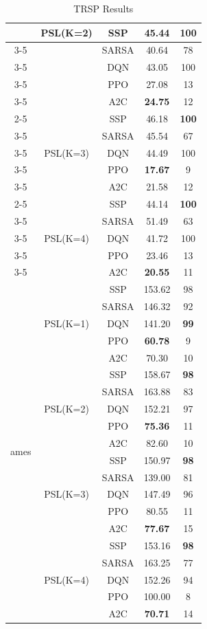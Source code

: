 \begin{table}[]
\begin{tabular}{|c|c|c|c|c|}
 & \multirow{5}{*}{PSL(K=2)} & SSP & 45.44 & \textbf{100} \\ \cline{3-5}
 &  & SARSA & 40.64 & 78 \\ \cline{3-5}
 &  & DQN & 43.05 & 100 \\ \cline{3-5}
 &  & PPO & 27.08 & 13 \\ \cline{3-5}
 &  & A2C & \textbf{24.75} & 12 \\ \cline{2-5}
 & \multirow{5}{*}{PSL(K=3)} & SSP & 46.18 & \textbf{100} \\ \cline{3-5}
 &  & SARSA & 45.54 & 67 \\ \cline{3-5}
 &  & DQN & 44.49 & 100 \\ \cline{3-5}
 &  & PPO & \textbf{17.67} & 9 \\ \cline{3-5}
 &  & A2C & 21.58 & 12 \\ \cline{2-5}
 & \multirow{5}{*}{PSL(K=4)} & SSP & 44.14 & \textbf{100} \\ \cline{3-5}
 &  & SARSA & 51.49 & 63 \\ \cline{3-5}
 &  & DQN & 41.72 & 100 \\ \cline{3-5}
 &  & PPO & 23.46 & 13 \\ \cline{3-5}
 &  & A2C & \textbf{20.55} & 11 \\ \hline
\multirow{20}{*}{ames} & \multirow{5}{*}{PSL(K=1)} & SSP & 153.62 & 98 \\ \cline{3-5}
 &  & SARSA & 146.32 & 92 \\ \cline{3-5}
 &  & DQN & 141.20 & \textbf{99} \\ \cline{3-5}
 &  & PPO & \textbf{60.78} & 9 \\ \cline{3-5}
 &  & A2C & 70.30 & 10 \\ \cline{2-5}
 & \multirow{5}{*}{PSL(K=2)} & SSP & 158.67 & \textbf{98} \\ \cline{3-5}
 &  & SARSA & 163.88 & 83 \\ \cline{3-5}
 &  & DQN & 152.21 & 97 \\ \cline{3-5}
 &  & PPO & \textbf{75.36} & 11 \\ \cline{3-5}
 &  & A2C & 82.60 & 10 \\ \cline{2-5}
 & \multirow{5}{*}{PSL(K=3)} & SSP & 150.97 & \textbf{98} \\ \cline{3-5}
 &  & SARSA & 139.00 & 81 \\ \cline{3-5}
 &  & DQN & 147.49 & 96 \\ \cline{3-5}
 &  & PPO & 80.55 & 11 \\ \cline{3-5}
 &  & A2C & \textbf{77.67} & 15 \\ \cline{2-5}
 & \multirow{5}{*}{PSL(K=4)} & SSP & 153.16 & \textbf{98} \\ \cline{3-5}
 &  & SARSA & 163.25 & 77 \\ \cline{3-5}
 &  & DQN & 152.26 & 94 \\ \cline{3-5}
 &  & PPO & 100.00 & 8 \\ \cline{3-5}
 &  & A2C & \textbf{70.71} & 14 \\ \hline
\end{tabular}
\caption{TRSP Results}
\label{tab:trsp_results}
\end{table}
